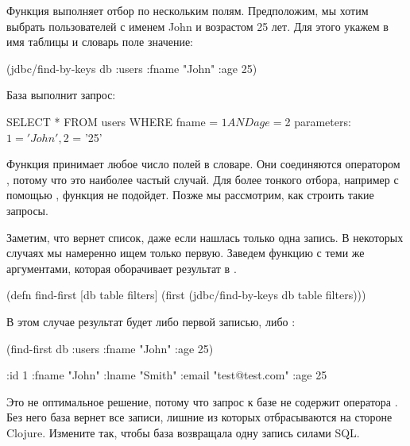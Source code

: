 Функция  выполняет отбор по нескольким полям. Предположим, мы хотим выбрать пользователей с именем John и возрастом 25 лет. Для этого укажем в  имя таблицы и словарь поле \arr значение:

\begin{english}
  \begin{clojure}
(jdbc/find-by-keys db :users {:fname "John" :age 25})
  \end{clojure}
\end{english}

База выполнит запрос:

\begin{english}
  \begin{sql}
SELECT * FROM users WHERE fname = $1 AND age = $2
parameters: $1 = 'John', $2 = '25'
  \end{sql}
\end{english}

Функция принимает любое число полей в словаре. Они соединяются оператором , потому что это наиболее частый случай. Для более тонкого отбора, например с помощью , функция не подойдет. Позже мы рассмотрим, как строить такие запросы.

Заметим, что  вернет список, даже если нашлась только одна запись. В некоторых случаях мы намеренно ищем только первую. Заведем функцию  с теми же аргументами, которая оборачивает результат в .

\begin{english}
  \begin{clojure}
(defn find-first [db table filters]
  (first (jdbc/find-by-keys db table filters)))
  \end{clojure}
\end{english}

В этом случае результат будет либо первой записью, либо :

\begin{english}
  \begin{clojure}
(find-first db :users {:fname "John" :age 25})

{:id 1 :fname "John" :lname "Smith"
 :email "test@test.com" :age 25}
  \end{clojure}
\end{english}

Это не оптимальное решение, потому что запрос к базе не содержит оператора . Без него база вернет все записи, лишние из которых отбрасываются на стороне Clojure. Измените  так, чтобы база возвращала одну запись силами SQL.

